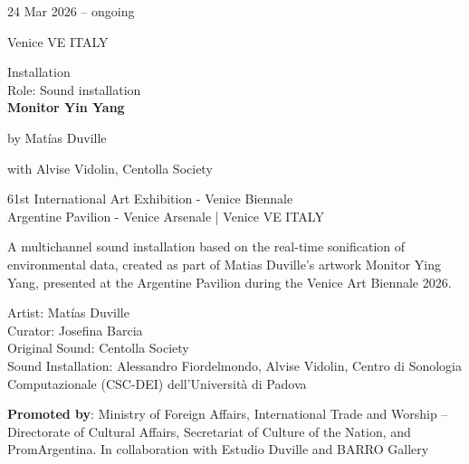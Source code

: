 \documentclass[7pt,a4paper]{article}
\begin{document}
\begin{mdframed}[
    backgroundcolor=entrygray,
    linecolor=entrygray,
    linewidth=0pt,
    innerleftmargin=6pt,
    innerrightmargin=6pt,
    innertopmargin=6pt,
    innerbottommargin=6pt,
    skipabove=0pt,
    skipbelow=0pt
]

\begin{minipage}[t]{0.28\textwidth}

24 Mar 2026 – ongoing

\scriptsize Venice VE ITALY


\end{minipage}
\begin{minipage}[t]{0.68\textwidth}
\small Installation
\\\scriptsize Role: Sound installation
\\ \normalsize \textbf{Monitor Yin Yang}
\par\scriptsize by Matías Duville
\par\scriptsize with Alvise Vidolin, Centolla Society
\vspace{0.25cm}



\small 61st International Art Exhibition - Venice Biennale\\Argentine Pavilion - Venice Arsenale | \scriptsize Venice VE ITALY

\vspace{0.1cm}
\scriptsize

A multichannel sound installation based on the real-time sonification of environmental data, created as part of Matias Duville’s artwork Monitor Ying Yang, presented at the Argentine Pavilion during the Venice Art Biennale 2026.\par\vspace{2mm}Artist: Matías Duville\\Curator: Josefina Barcia\\Original Sound: Centolla Society\\Sound Installation: Alessandro Fiordelmondo, Alvise Vidolin, Centro di Sonologia Computazionale (CSC-DEI) dell’Università di Padova

\vspace{0.1cm}
\par \textbf{Promoted by}: Ministry of Foreign Affairs, International Trade and Worship – Directorate of Cultural Affairs, Secretariat of Culture of the Nation, and PromArgentina. In collaboration with Estudio Duville and BARRO Gallery
\end{minipage}
\vspace{0.25cm}
\end{mdframed}
\end{document}
